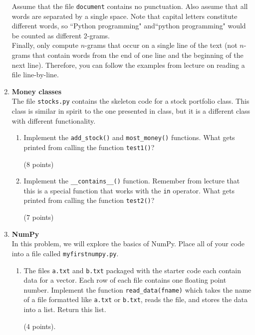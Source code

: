 \documentclass{article}
\newcounter{points}
\newcommand\setpoints[1]{\addtocounter{points}{#1}(#1 points)}
\begin{document}
\begin{enumerate}
Assume that the file \texttt{document} contains no punctuation.  Also assume that all words are separated by a single space. Note that capital letters constitute different words, so ``Python programming" and``python programming" would be counted as different 2-grams. \\

Finally, only compute $n$-grams that occur on a single line of the text (not $n$-grams that contain words from the end of one line and the beginning of the next line).  Therefore, you can follow the examples from lecture on reading a file line-by-line. \\

\item \textbf{Money classes} \\
The file \texttt{stocks.py} contains the skeleton code for a stock portfolio class.  This class is similar in spirit to the one presented in class, but it is a different class with different functionality.

\begin{enumerate}
\item Implement the \texttt{add\_stock()} and \texttt{most\_money()} functions.  What gets printed from calling the function \texttt{test1()}? \setpoints{8}
\end{enumerate}

\begin{enumerate}
\setcounter{enumii}{1}
\item Implement the \texttt{\_\_contains\_\_()} function.  Remember from lecture that this is a special function that works with the \texttt{in} operator.  What gets printed from calling the function \texttt{test2()}? \setpoints{7}
\end{enumerate}

\newpage
\item \textbf{NumPy} \\
In this problem, we will explore the basics of NumPy.  Place all of your code into a file called \texttt{myfirstnumpy.py}.

\begin{enumerate}
\item The files \texttt{a.txt} and \texttt{b.txt} packaged with the starter code each contain data for a vector.  Each row of each file contains one floating point number.  Implement the function \texttt{read\_data(fname)} which takes the name of a file formatted like \texttt{a.txt} or \texttt{b.txt}, reads the file, and stores the data into a list. Return this list. \setpoints{4}.
\end{enumerate}


\end{enumerate}
\end{document}
